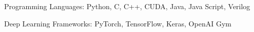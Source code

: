 

\begin{cventries}

\vspace{5mm}

  \begin{cvitems} %
    \item {Programming Languages: Python, C, C++, CUDA, Java, Java Script, Verilog}
    \item {Deep Learning Frameworks: PyTorch, TensorFlow, Keras, OpenAI Gym}
   \end{cvitems}
    
\end{cventries}
